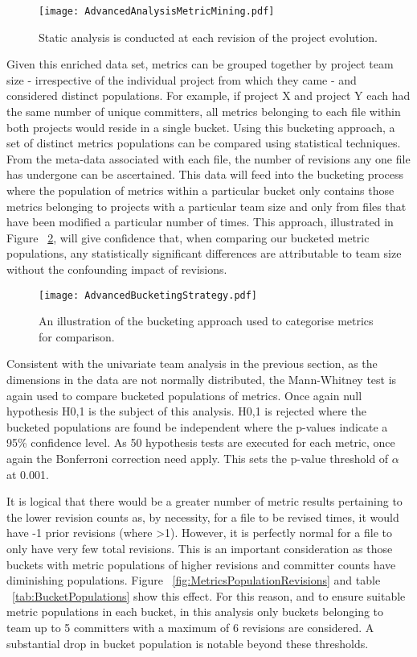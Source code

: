 \begin{figure}[htbp!] 
\centering    
\texttt{[image: AdvancedAnalysisMetricMining.pdf]}
\caption{Static analysis is conducted at each revision of the project evolution.}
\label{fig:AdvancedAnalysisMetricMining}
\end{figure}

Given this enriched data set, metrics can be grouped together by project team size - irrespective of the individual project from which they came - and considered distinct populations. For example, if project X and project Y each had the same number of unique committers, all metrics belonging to each file within both projects would reside in a single bucket. Using this bucketing approach, a set of distinct metrics populations can be compared using statistical techniques. From the meta-data associated with each file, the number of revisions any one file has undergone can be ascertained. This data will feed into the bucketing process where the population of metrics within a particular bucket only contains those metrics belonging to projects with a particular team size and only from files that have been modified a particular number of times. This approach, illustrated in Figure ~\ref{fig:AdvancedBucketingStrategy}, will give confidence that, when comparing our bucketed metric populations, any statistically significant differences are attributable to team size without the confounding impact of revisions.

\begin{figure}[htbp!] 
\centering    
\texttt{[image: AdvancedBucketingStrategy.pdf]}
\caption{An illustration of the bucketing approach used to categorise metrics for comparison.}
\label{fig:AdvancedBucketingStrategy}
\end{figure}
	
Consistent with the univariate team analysis in the previous section, as the dimensions in the data are not normally distributed, the Mann-Whitney test is again used to compare bucketed populations of metrics. Once again null hypothesis H0,1 is the subject of this analysis. H0,1 is rejected where the bucketed populations are found be independent where the p-values indicate a 95\% confidence level. As 50 hypothesis tests are executed for each metric, once again the Bonferroni correction need apply. This sets the p-value threshold of $\alpha$ at 0.001.

It is logical that there would be a greater number of metric results pertaining to the lower revision counts as, by necessity, for a file to be revised  times, it would have -1 prior revisions (where >1). However, it is perfectly normal for a file to only have very few total revisions. This is an important consideration as those buckets with metric populations of higher revisions and committer counts have diminishing populations. Figure ~\ref{fig:MetricsPopulationRevisions} and table ~\ref{tab:BucketPopulations} show this effect. For this reason, and to ensure suitable metric populations in each bucket, in this analysis only buckets belonging to team up to 5 committers with a maximum of 6 revisions are considered. A substantial drop in bucket population is notable beyond these thresholds.

